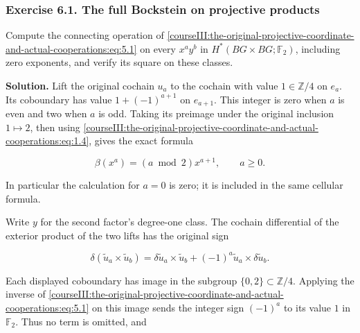 \label{courseIII:the-original-projective-coordinate-and-actual-cooperations:section-6}

\subsubsection{Exercise 6.1. The full Bockstein on projective products}
\label{courseIII:the-original-projective-coordinate-and-actual-cooperations:exercise-6.1}

\label{courseIII:projective-coop:6.1}

Compute the connecting operation of \eqref{courseIII:the-original-projective-coordinate-and-actual-cooperations:eq:5.1} on every \(x^a y^b\) in \(H^*(BG\times BG;\mathbb F_2)\), including zero exponents, and verify its square on these classes.

\textbf{Solution.} Lift the original cochain \(u_a\) to the cochain with value \(1\in\mathbb Z/4\) on \(e_a\). Its coboundary has value \(1+(-1)^{a+1}\) on \(e_{a+1}\). This integer is zero when \(a\) is even and two when \(a\) is odd. Taking its preimage under the original inclusion \(1\mapsto2\), then using \eqref{courseIII:the-original-projective-coordinate-and-actual-cooperations:eq:1.4}, gives the exact formula

\begin{equation}
\beta(x^a)=(a\bmod2)x^{a+1},\qquad a\geq0.
 \label{courseIII:the-original-projective-coordinate-and-actual-cooperations:eq:6.1}
\end{equation}

In particular the calculation for \(a=0\) is zero; it is included in the same cellular formula.

Write \(y\) for the second factor's degree-one class. The cochain differential of the exterior product of the two lifts has the original sign

\begin{equation}
\delta(\widetilde u_a\times\widetilde u_b)
   =\delta\widetilde u_a\times\widetilde u_b
      +(-1)^a\widetilde u_a\times\delta\widetilde u_b.
 \label{courseIII:the-original-projective-coordinate-and-actual-cooperations:eq:6.2}
\end{equation}

Each displayed coboundary has image in the subgroup \(\{0,2\}\subset\mathbb Z/4\). Applying the inverse of \eqref{courseIII:the-original-projective-coordinate-and-actual-cooperations:eq:5.1} on this image sends the integer sign \((-1)^a\) to its value \(1\) in \(\mathbb F_2\). Thus no term is omitted, and

